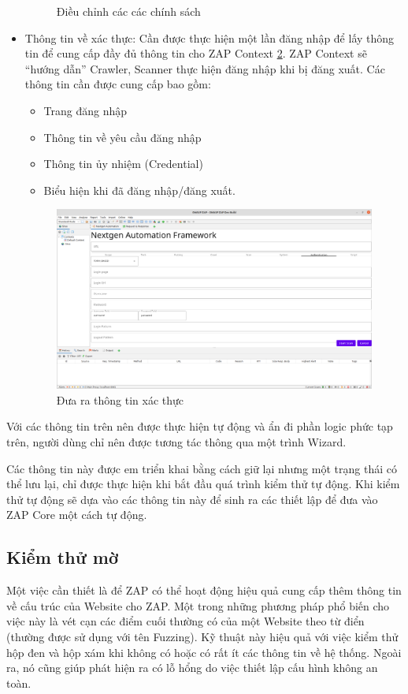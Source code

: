\documentclass[./../main.tex]{subfiles}
\begin{document}
\begin{itemize}
\begin{figure}[ht!]
		      \caption{ Điều chỉnh các các chính sách }
		      \label{fig:policy}
	      \end{figure}
	\item Thông tin về xác thực: Cần được thực hiện một lần đăng nhập
	      để lấy thông tin để cung cấp đầy đủ thông tin cho ZAP Context \ref{fig:authen}.
	      ZAP Context sẽ “hướng dẫn” Crawler, Scanner thực hiện đăng nhập khi
	      bị đăng xuất. Các thông tin cần được cung cấp bao gồm:
	      \begin{itemize}
		      \item Trang đăng nhập
		      \item Thông tin về yêu cầu đăng nhập
		      \item Thông tin ủy nhiệm (Credential)
		      \item Biểu hiện khi đã đăng nhập/đăng xuất.
	      \end{itemize}
	      \begin{figure}[ht!]
		      \includegraphics[width=\linewidth]{./images/authen.png}
		      \caption{ Đưa ra thông tin xác thực }
		      \label{fig:authen}
	      \end{figure}

\end{itemize}
Với các thông tin trên nên được thực hiện tự động và ẩn đi phần logic
phức tạp trên, người dùng chỉ nên được tương tác thông qua một trình
Wizard.

Các thông tin này được em triển khai bằng cách giữ lại nhưng một
trạng thái có thể lưu lại, chỉ được thực hiện khi bắt đầu quá trình
kiểm thử tự động. Khi kiểm thử tự động sẽ dựa vào các thông tin này
để sinh ra các thiết lập để đưa vào ZAP Core một cách tự động.

\subsection{Kiểm thử mờ}
Một việc cần thiết là để ZAP có thể hoạt động hiệu quả cung cấp thêm
thông tin về cấu trúc của Website cho ZAP. Một trong những phương pháp
phổ biến cho việc này là vét cạn các điểm cuối thường có của một Website
theo từ điển (thường được sử dụng với tên Fuzzing). Kỹ thuật này hiệu
quả với việc kiểm thử hộp đen và hộp xám khi không có hoặc có rất ít
các thông tin về hệ thống. Ngoài ra, nó cũng giúp phát hiện ra có lỗ
hổng do việc thiết lập cấu hình không an toàn.
\end{document}
